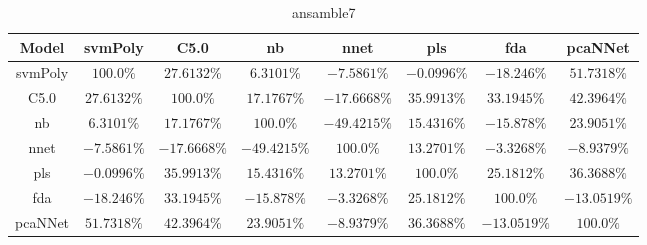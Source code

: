 \begin{table}[!ht]
	\centering
	\begin{tabular}{|c|c|c|c|c|c|c|c|}
		\hline
		Model & svmPoly & C5.0 & nb & nnet & pls & fda & pcaNNet \\ \hline
		svmPoly & $100.0\%$ & $27.6132\%$ & $6.3101\%$ & $-7.5861\%$ & $-0.0996\%$ & $-18.246\%$ & $51.7318\%$ \\ \hline
		C5.0 & $27.6132\%$ & $100.0\%$ & $17.1767\%$ & $-17.6668\%$ & $35.9913\%$ & $33.1945\%$ & $42.3964\%$ \\ \hline
		nb & $6.3101\%$ & $17.1767\%$ & $100.0\%$ & $-49.4215\%$ & $15.4316\%$ & $-15.878\%$ & $23.9051\%$ \\ \hline
		nnet & $-7.5861\%$ & $-17.6668\%$ & $-49.4215\%$ & $100.0\%$ & $13.2701\%$ & $-3.3268\%$ & $-8.9379\%$ \\ \hline
		pls & $-0.0996\%$ & $35.9913\%$ & $15.4316\%$ & $13.2701\%$ & $100.0\%$ & $25.1812\%$ & $36.3688\%$ \\ \hline
		fda & $-18.246\%$ & $33.1945\%$ & $-15.878\%$ & $-3.3268\%$ & $25.1812\%$ & $100.0\%$ & $-13.0519\%$ \\ \hline
		pcaNNet & $51.7318\%$ & $42.3964\%$ & $23.9051\%$ & $-8.9379\%$ & $36.3688\%$ & $-13.0519\%$ & $100.0\%$ \\ \hline
	\end{tabular}
	\caption{ansamble7}
	\label{tab:ansamble7}
\end{table}
